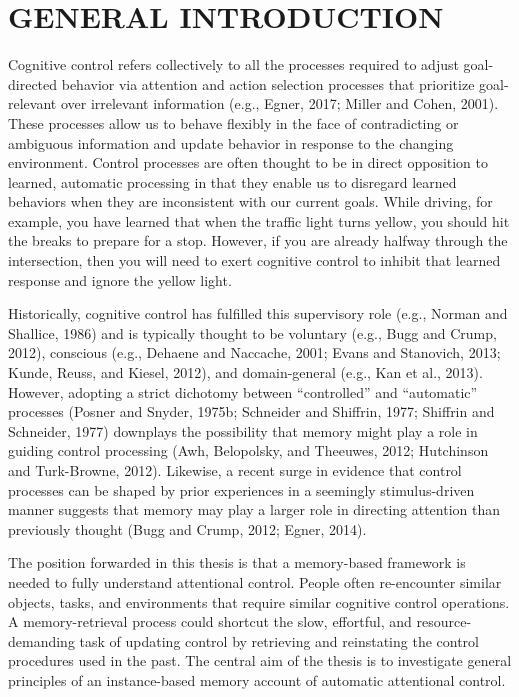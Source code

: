 \documentclass[]{DissertateCUNY}
\begin{document}
\newpage
{}

\newpage
{}
\fancyhead[R]{\thepage}
\fancyfoot[C]{}

\chapter{GENERAL INTRODUCTION}

Cognitive control refers collectively to all the processes required to
adjust goal-directed behavior via attention and action selection
processes that prioritize goal-relevant over irrelevant information
(e.g., Egner, 2017; Miller and Cohen, 2001). These processes allow us to
behave flexibly in the face of contradicting or ambiguous information
and update behavior in response to the changing environment. Control
processes are often thought to be in direct opposition to learned,
automatic processing in that they enable us to disregard learned
behaviors when they are inconsistent with our current goals. While
driving, for example, you have learned that when the traffic light turns
yellow, you should hit the breaks to prepare for a stop. However, if you
are already halfway through the intersection, then you will need to
exert cognitive control to inhibit that learned response and ignore the
yellow light.

Historically, cognitive control has fulfilled this supervisory role
(e.g., Norman and Shallice, 1986) and is typically thought to be
voluntary (e.g., Bugg and Crump, 2012), conscious (e.g., Dehaene and
Naccache, 2001; Evans and Stanovich, 2013; Kunde, Reuss, and Kiesel,
2012), and domain-general (e.g., Kan et al., 2013). However, adopting a
strict dichotomy between ``controlled'' and ``automatic'' processes
(Posner and Snyder, 1975b; Schneider and Shiffrin, 1977; Shiffrin and
Schneider, 1977) downplays the possibility that memory might play a role
in guiding control processing (Awh, Belopolsky, and Theeuwes, 2012;
Hutchinson and Turk-Browne, 2012). Likewise, a recent surge in evidence
that control processes can be shaped by prior experiences in a seemingly
stimulus-driven manner suggests that memory may play a larger role in
directing attention than previously thought (Bugg and Crump, 2012;
Egner, 2014).

The position forwarded in this thesis is that a memory-based framework
is needed to fully understand attentional control. People often
re-encounter similar objects, tasks, and environments that require
similar cognitive control operations. A memory-retrieval process could
shortcut the slow, effortful, and resource-demanding task of updating
control by retrieving and reinstating the control procedures used in the
past. The central aim of the thesis is to investigate general principles
of an instance-based memory account of automatic attentional control.
\end{document}
